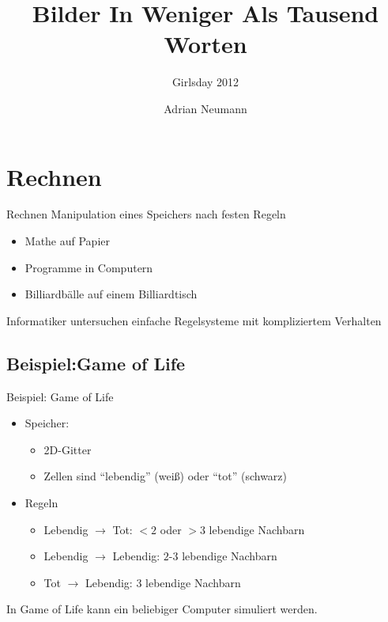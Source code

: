 \documentclass{beamer}
\title{Bilder In Weniger Als Tausend Worten}
\subtitle{Girlsday 2012}
\institute{Universit\"at des Saarlandes}
\date{}
\author[A. Neumann]{
	Adrian Neumann
}
\theoremstyle{example}
\begin{document}
\lstset{basicstyle=\ttfamily\footnotesize, numbers=left, numberstyle=\tiny, language=cf, tabsize=2}
\frame{\titlepage}

\section{Rechnen}
\begin{frame}{Rechnen}
Manipulation eines Speichers nach festen Regeln\pause
\begin{itemize}
\item Mathe auf Papier\pause
\item Programme in Computern\pause
\item Billiardbälle auf einem Billiardtisch\pause
\end{itemize}
\begin{block}{}\centering
Informatiker untersuchen einfache Regelsysteme mit kompliziertem Verhalten
\end{block}
\end{frame}

\subsection{Beispiel:Game of Life}
\begin{frame}{Beispiel: Game of Life}
\begin{itemize}
\item Speicher: 
  \begin{itemize}
    \item 2D-Gitter\pause
    \item Zellen sind ``lebendig'' (weiß) oder ``tot'' (schwarz)\pause
  \end{itemize}
\item Regeln\pause
  \begin{itemize}
  \item Lebendig $\rightarrow$ Tot: $<2$ oder $>3$ lebendige Nachbarn\pause
  \item Lebendig $\rightarrow$ Lebendig: $2$-$3$ lebendige Nachbarn\pause
  \item Tot $\rightarrow$ Lebendig: 3 lebendige Nachbarn
  \end{itemize}
\end{itemize}\pause
\begin{block}{}\centering
\centering In Game of Life kann ein beliebiger Computer simuliert werden.
\end{block}
\end{frame}
\end{document}
